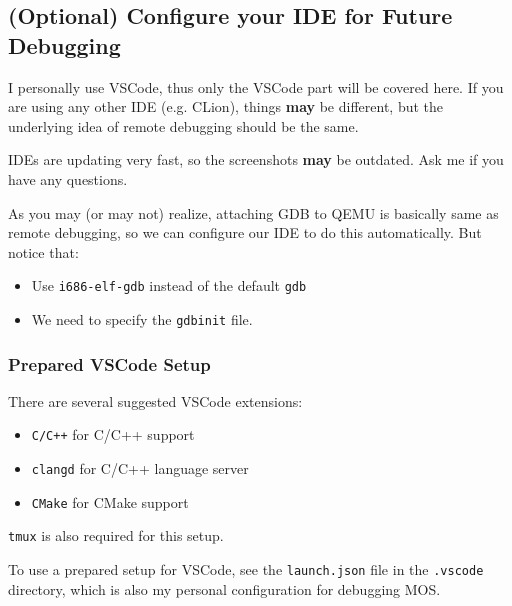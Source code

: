 \subsection{(Optional) Configure your IDE for Future Debugging} \label{sec:ide-config}

\begin{note}
    \item I personally use VSCode, thus only the VSCode part will be covered here. If you are
    using any other IDE (e.g. CLion), things \textbf{may} be different, but the underlying idea
    of remote debugging should be the same.

    \item IDEs are updating very fast, so the screenshots \textbf{may} be outdated. Ask me if you
    have any questions.
\end{note}

As you may (or may not) realize, attaching GDB to QEMU is basically same as remote debugging, so
we can configure our IDE to do this automatically. But notice that:

\begin{itemize}
    \item Use \texttt{i686-elf-gdb} instead of the default \texttt{gdb}
    \item We need to specify the \texttt{gdbinit} file.
\end{itemize}

\subsubsection{Prepared VSCode Setup} \label{sec:vscode-config}

\begin{tip}
    \item There are several suggested VSCode extensions:
    \begin{itemize}
        \item \texttt{C/C++} for C/C++ support
        \item \texttt{clangd} for C/C++ language server
        \item \texttt{CMake} for CMake support
    \end{itemize}
    \item \texttt{tmux} is also required for this setup.
\end{tip}

To use a prepared setup for VSCode, see the \texttt{launch.json} file in the \texttt{.vscode}
directory, which is also my personal configuration for debugging MOS.


